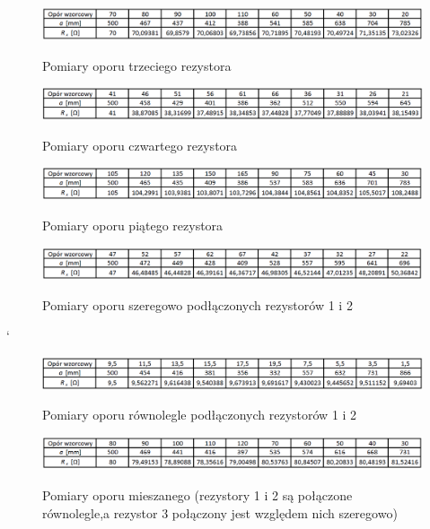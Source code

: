 \documentclass [a4paper,11pt]{article}
\begin{document}
\begin{itemize}
	\begin{figure}[!h]
		\centering
		\caption{Pomiary oporu trzeciego rezystora}
		\includegraphics[width=\textwidth]{R3}
		\label{fig:r3}
	\end{figure}

	\begin{figure}[!h]
		\centering
		\caption{Pomiary oporu czwartego rezystora}
		\includegraphics[width=\textwidth]{R4}
		\label{fig:r4}
	\end{figure}

	\begin{figure}[!h]
		\centering
		\caption{Pomiary oporu piątego rezystora}
		\includegraphics[width=\textwidth]{R5}
		\label{fig:r5}
	\end{figure}

	\begin{figure}[!h]
		\centering
		\caption{Pomiary oporu szeregowo podłączonych rezystorów 1 i 2}
		\includegraphics[width=\textwidth]{R1+R2}
		\label{fig:r1+r2}
	\end{figure}
`	
	\begin{figure}[!h]
		\centering
		\caption{Pomiary oporu równolegle podłączonych rezystorów 1 i 2}
		\includegraphics[width=\textwidth]{R1zR2}
		\label{fig:r1zr2}
	\end{figure}

	\begin{figure}[!h]
		\centering
		\begin{center}
		\caption{Pomiary oporu mieszanego (rezystory 1 i 2 są połączone równolegle,a rezystor 3 połączony jest względem nich szeregowo)}
		\includegraphics[width=\textwidth]{(R1zR2)+R3}
		\label{fig:(r1zr2)+r3}
		\end{center}
	\end{figure}
		
	\end{itemize}
\end{document}
